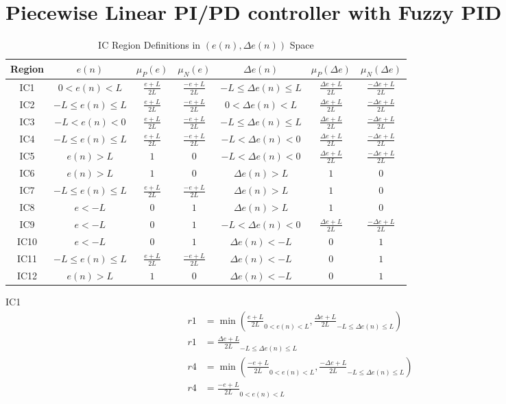 \section{Piecewise Linear PI/PD controller with Fuzzy PID}
\begin{table}[h!]
\centering
\caption{IC Region Definitions in $(e(n), \Delta e(n))$ Space}
\begin{tabular}{c|ccc|ccc}
\toprule
Region & $e(n)$ & $\mu_P(e)$ & $\mu_N(e)$ &$\Delta e(n)$ & $\mu_P(\Delta e)$ & $\mu_N(\Delta e)$\\
\midrule
IC1 & $0<e(n)<L$ & $\frac{e+L}{2L}$ & $\frac{-e+L}{2L}$ & $-L\leq\Delta e(n)\leq L$ & $\frac{\Delta e+L}{2L}$ & $\frac{-\Delta e+L}{2L}$\\
IC2 & $-L\leq e(n)\leq L$ & $\frac{e+L}{2L}$ & $\frac{-e+L}{2L}$ & $0<\Delta e(n)<L$ & $\frac{\Delta e+L}{2L}$  & $\frac{-\Delta e+L}{2L}$\\
IC3 & $-L<e(n)<0$ & $\frac{e+L}{2L}$ & $\frac{-e+L}{2L}$ & $-L\leq\Delta e(n)\leq L$ & $\frac{\Delta e+L}{2L}$  & $\frac{-\Delta e+L}{2L}$\\
IC4 & $-L\leq e(n)\leq L$ & $\frac{e+L}{2L}$ & $\frac{-e+L}{2L}$ & $-L<\Delta e(n)<0$ & $\frac{\Delta e+L}{2L}$  & $\frac{-\Delta e+L}{2L}$\\
IC5 & $e(n)>L$ & $1$  & $0$ & $-L<\Delta e(n)<0$ & $\frac{\Delta e+L}{2L}$  & $\frac{-\Delta e+L}{2L}$\\
IC6 & $e(n)>L$ & $1$ & $0$ & $\Delta e(n)>L$ & $1$ & $0$\\
IC7 & $-L\leq e(n)\leq L$ & $\frac{e+L}{2L}$  & $\frac{-e+L}{2L}$ & $\Delta e(n)>L$ & $1$ & $0$\\
IC8 & $e<-L$ & $0$ & $1$ & $\Delta e(n)>L$ & $1$ & $0$\\
IC9 & $e<-L$ & $0$& $1$   & $-L<\Delta e(n)<0$ & $\frac{\Delta e+L}{2L}$ & $\frac{-\Delta e+L}{2L}$\\
IC10 & $e<-L$ & $0$& $1$   & $\Delta e(n)<-L$ & $0$ & $1$\\
IC11 & $-L\leq e(n)\leq L$ & $\frac{e+L}{2L}$  & $\frac{-e+L}{2L}$  & $\Delta e(n)<-L$ & $0$ & $1$\\
IC12 & $e(n)>L$ & $1$ & $0$ & $\Delta e(n)<-L$ & $0$ & $1$\\
\bottomrule
\end{tabular}
\end{table}

IC1 
\begin{equation}
\begin{split}
    r1&=\min{\left(\frac{e+L}{2L}_{0<e(n)<L},\frac{\Delta e+L}{2L}_{-L\leq\Delta e(n)\leq L}\right)}\\
    r1&=\frac{\Delta e+L}{2L}_{-L\leq\Delta e(n)\leq L}\\
    r4&=\min{\left(\frac{-e+L}{2L}_{0<e(n)<L},\frac{-\Delta e+L}{2L}_{-L\leq\Delta e(n)\leq L}\right)}\\
    r4&=\frac{-e+L}{2L}_{0<e(n)<L}
\end{split}
\end{equation}

